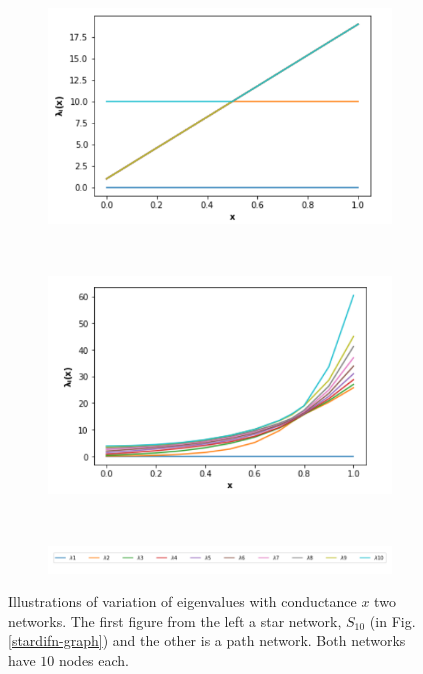 \documentclass[10pt,a4paper]{article}
\begin{document}
        \begin{figure}[!h]
        	\centering
        	\begin{subfigure}[b]{0.45\textwidth}
        		\includegraphics[width= \textwidth]{images/Star-network-eigenplot.png}
        		\label{star-spectra}
        	\end{subfigure}~
        	\begin{subfigure}[b]{0.45\textwidth}
        		\includegraphics[width= \textwidth]{images/Path-network-eigenplot.png}
        		\label{path-spectra}
        	\end{subfigure} \\
        	\begin{subfigure}[b]{0.85\textwidth}
        		\includegraphics[width= \textwidth]{images/legend-eigenvalues.png}
        	\end{subfigure}
        	\caption{Illustrations of variation of eigenvalues with conductance $x$ two networks. The first figure from the left a star network, $S_{10}$ (in Fig. \ref{stardifn-graph}) and the other is a path network. Both networks have $10$ nodes each.}
        	\label{eigen-xvalues}
        \end{figure}
\end{document}
